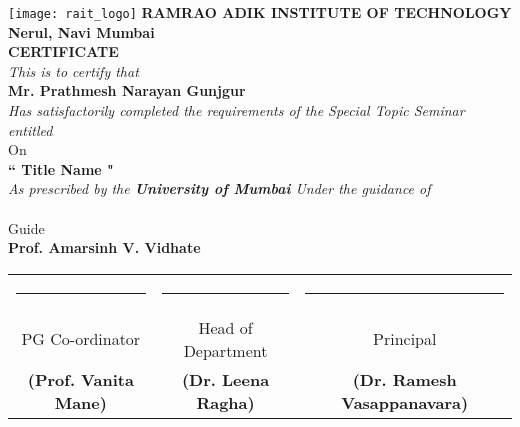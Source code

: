 \begin{center}
\texttt{[image: rait\_logo]}
{\large \bf RAMRAO ADIK INSTITUTE OF TECHNOLOGY}\\
{\normalsize \bf Nerul, Navi Mumbai}\\
\vspace{0.5in}
{\huge \bf {CERTIFICATE}}\\
\vspace{0.5in}
{\normalsize \it This is to certify that}\\
\vspace{0.3in}
{\large \bf Mr. Prathmesh Narayan Gunjgur}\\
\vspace{0.3in}
{\normalsize \it Has satisfactorily completed the requirements of the Special Topic Seminar entitled}\\
\vspace{0.1in}
{On}\\
\vspace{0.1in}
{\large \bf `` Title Name "}\\
\vspace{0.2in}
{\normalsize \it As prescribed by the \textbf{University of Mumbai} Under the guidance of}\\
\vspace{0.6in}
\underline{\hspace{4cm}}\\
{\normalsize Guide}\\
{\large\bf Prof. Amarsinh V. Vidhate}\\
\end{center}
\vspace{0.2in}
\begin{center}
\begin{tabular}{ccc}

      \noindent\rule{4cm}{0.5pt} & \hspace{0.5in}\noindent\rule{4cm}{0.5pt} & \hspace{0.12in}\noindent\rule{4cm}{0.5pt} \\
      \small{PG Co-ordinator} & \hspace{0.5in}\small{Head of Department} & \hspace{0.12in}\small{Principal} \\
   \small{\textbf{(Prof. Vanita  Mane)}}& \hspace{0.5in}\small{\textbf{(Dr. Leena Ragha)}} & \hspace{0.3in}\small{\textbf{(Dr. Ramesh Vasappanavara)}} \\
    \end{tabular}
\end{center}




